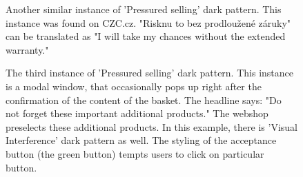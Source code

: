\begin{figure}[ht]
\begin{minipage}[ht]{0.40\linewidth}
                    \caption{Another similar instance of 'Pressured selling' dark pattern. This instance was found on CZC.cz. "Risknu to bez prodloužené záruky" can be translated as "I will take my chances without the extended warranty."}
                    \label{fig:pressured-selling-czc}
                \end{minipage}
                \begin{minipage}[ht]{1\linewidth}
                    \vspace{0.3cm}
                    \centering
                    \caption{The third instance of 'Pressured selling' dark pattern. This instance is a modal window, that occasionally pops up right after the confirmation of the content of the basket. The headline says: "Do not forget these important additional products." The webshop preselects these additional products. In this example, there is 'Visual Interference' dark pattern as well. The styling of the acceptance button (the green button) tempts users to click on particular button.}
                    \label{fig:pressured-selling-alza2}
                \end{minipage}
            \end{figure}

